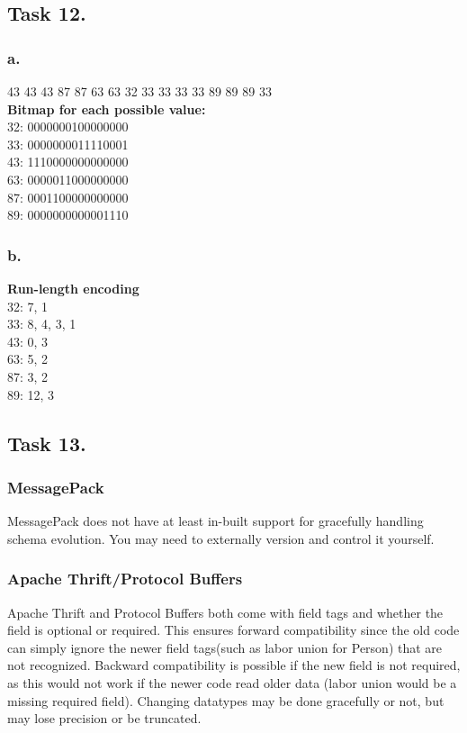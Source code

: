 \documentclass[12pt, titlepage]{report}
\begin{document}
\subsection*{Task 12.}
\subsubsection{a.}
43 43 43 87 87 63 63 32 33 33 33 33 89 89 89 33 \\
\textbf{Bitmap for each possible value:} \\
32: 0000000100000000 \\
33: 0000000011110001 \\
43: 1110000000000000 \\
63: 0000011000000000 \\
87: 0001100000000000 \\
89: 0000000000001110
\subsubsection{b.}
\textbf{Run-length encoding} \\
32: 7, 1 \\
33: 8, 4, 3, 1 \\
43: 0, 3 \\
63: 5, 2 \\
87: 3, 2 \\
89: 12, 3
\subsection*{Task 13.}
\subsubsection{MessagePack}
MessagePack does not have at least in-built support for gracefully handling schema evolution. You may need to externally version and control it yourself.
\subsubsection{Apache Thrift/Protocol Buffers}
Apache Thrift and Protocol Buffers both come with field tags and whether the field is optional or required. This ensures forward compatibility since the old code can simply ignore the newer field tags(such as labor union for Person) that are not recognized. Backward compatibility is possible if the new field is not required, as this would not work if the newer code read older data (labor union would be a missing required field). Changing datatypes may be done gracefully or not, but may lose precision or be truncated.
\end{document}

